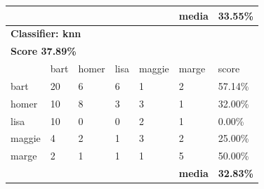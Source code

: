 \documentclass[journal]{IEEEtran}
\begin{document}
\begin{table}[!htb]
\begin{tabular}{l|l|l|l|l|l|l}
\textbf{} & \textbf{} & \textbf{} & \textbf{} & \textbf{} & \textbf{media} & \textbf{33.55\%} \\ \hline
\multicolumn{7}{l}{\textbf{Classifier: knn}}                                                \\ \hline
\multicolumn{7}{l}{\textbf{Score 37.89\%}}                                                  \\ \hline
          & bart      & homer     & lisa      & maggie    & marge          & score            \\ \hline
bart      & 20        & 6         & 6         & 1         & 2              & 57.14\%          \\ \hline
homer     & 10        & 8         & 3         & 3         & 1              & 32.00\%          \\ \hline
lisa      & 10        & 0         & 0         & 2         & 1              & 0.00\%           \\ \hline
maggie    & 4         & 2         & 1         & 3         & 2              & 25.00\%          \\ \hline
marge     & 2         & 1         & 1         & 1         & 5              & 50.00\%          \\ \hline
\textbf{} & \textbf{} & \textbf{} & \textbf{} & \textbf{} & \textbf{media} & \textbf{32.83\%} \\ \hline
\end{tabular}
\end{table}
\end{document}
